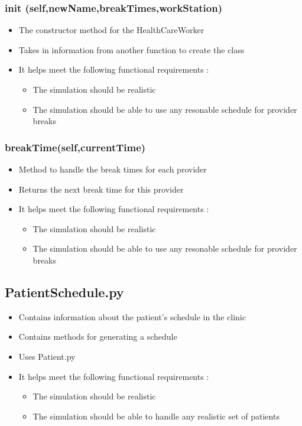 \documentclass[12pt]{article}
\begin{document}
\subsubsection{ init (self,newName,breakTimes,workStation)}
\begin{itemize}
	\item The constructor method for the HealthCareWorker
	\item Takes in information from another function to create the class
	\item It helps meet the following functional requirements :
	\begin{itemize}
		\item The simulation should be realistic
		\item The simulation should be able to use any resonable schedule for provider breaks
	\end{itemize}
\end{itemize}
\subsubsection{breakTime(self,currentTime)}
\begin{itemize}
	\item Method to handle the break times for each provider
	\item Returns the next break time for this provider
	\item It helps meet the following functional requirements :
	\begin{itemize}
		\item The simulation should be realistic
		\item The simulation should be able to use any resonable schedule for provider breaks
	\end{itemize}
\end{itemize}
\subsection{PatientSchedule.py}
\begin{itemize}  
\item Contains information about the patient's schedule in the clinic
\item Contains methods for generating a schedule 
\item Uses Patient.py
\item It helps meet the following functional requirements :
\begin{itemize}
	\item The simulation should be realistic
	\item The simulation should be able to handle any realistic set of patients
\end{itemize}
\end{itemize}
\end{document}
